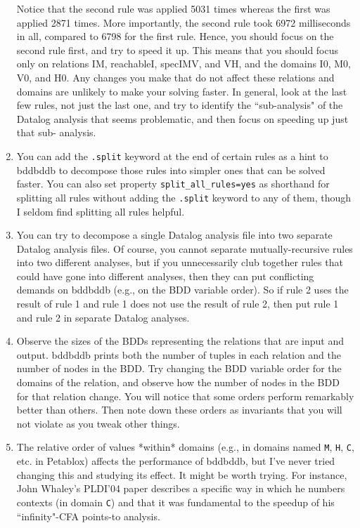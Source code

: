 \begin{enumerate}
Notice that the second rule was applied 5031 times whereas the first
was applied 2871 times.  More importantly, the second rule took 6972
milliseconds in all, compared to 6798 for the first rule.  Hence, you
should focus on the second rule first, and try to speed it up.  This
means that you should focus only on relations IM, reachableI, specIMV,
and VH, and the domains I0, M0, V0, and H0.  Any changes you make that
do not affect these relations and domains are unlikely to make your
solving faster.  In general, look at the last few rules, not just the
last one, and try to identify the ``sub-analysis" of the Datalog analysis
that seems problematic, and then focus on speeding up just that sub-
analysis.

\item

You can add the \verb+.split+ keyword at the end of certain rules as a
hint to bddbddb to decompose those rules into simpler ones that can be
solved faster.  You can also set property \verb+split_all_rules=yes+ as shorthand
for splitting all rules without adding the \verb+.split+ keyword to any of
them, though I seldom find splitting all rules helpful.

\item

You can try to decompose a single Datalog analysis file into two separate Datalog analysis
files.  Of course, you cannot separate mutually-recursive rules into two
different analyses, but if you unnecessarily club
together rules that could have gone into different analyses, then they
can put conflicting demands on bddbddb (e.g., on the BDD variable order).
So if rule 2 uses the result of rule 1 and rule 1 does not use the result of
rule 2, then put rule 1 and rule 2 in separate Datalog analyses.

\item

Observe the sizes of the BDDs representing the relations that are
input and output.  bddbddb prints both the number of tuples in each
relation and the number of nodes in the BDD.  Try changing the
BDD variable order for the domains of the relation, and observe how the
number of nodes in the BDD for that relation change.  You will
notice that some orders perform remarkably better than others.  Then
note down these orders as invariants that you will not violate as
you tweak other things.

\item

The relative order of values *within* domains (e.g.,
in domains named \verb+M+, \verb+H+, \verb+C+, etc. in Petablox) affects the
performance of bddbddb, but
I've never tried changing this and studying its effect.  It might be
worth trying.  For instance, John Whaley's PLDI'04 paper describes a
specific way in which he numbers contexts (in domain \verb+C+) and that it was
fundamental to the speedup of his ``infinity"-CFA points-to analysis.


\end{enumerate}

